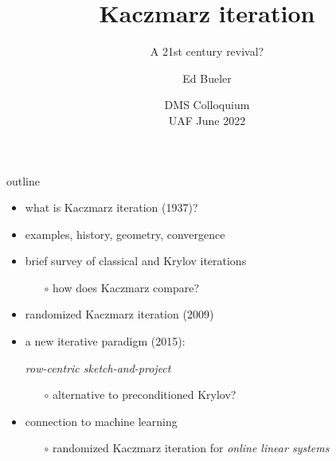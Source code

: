 \documentclass[usepdftitle=false,usenames,dvipsnames]{beamer}
\title{Kaczmarz iteration}
\subtitle{A 21st century revival?}
\author{Ed Bueler}
\date{DMS Colloquium \\ UAF June 2022}
\begin{document}
\begin{frame}
	\maketitle
\end{frame}


\begin{frame}{outline}

\begin{itemize}
\item what is Kaczmarz iteration (1937)?
\item examples, history, geometry, convergence
\item brief survey of classical and Krylov iterations
    \begin{itemize}
    \item[$\circ$] how does Kaczmarz compare?
    \end{itemize}
\item randomized Kaczmarz iteration (2009)
\item a new iterative paradigm (2015):

\begin{center}
\emph{row-centric sketch-and-project}
\end{center}

    \begin{itemize}
    \item[$\circ$] alternative to preconditioned Krylov?
    \end{itemize}
\item connection to machine learning
    \begin{itemize}
    \item[$\circ$] randomized Kaczmarz iteration for \emph{online linear systems}
    \end{itemize}
\end{itemize}
\end{frame}
\end{document}
